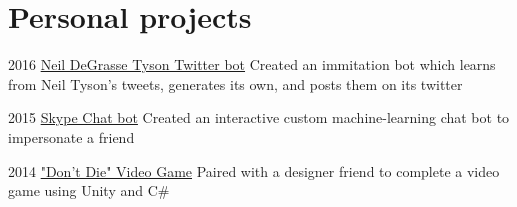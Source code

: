 \documentclass[oldfontcommands]{tccv}
\begin{document}
\section{Personal projects}

\begin{yearlist}

\item{2016}
     {\href{https://twitter.com/neiltyson_bot}{Neil DeGrasse Tyson Twitter bot}}
     {Created an immitation bot which learns from Neil Tyson's tweets, generates its own, and posts them on its twitter}

\item{2015}
     {\href{https://github.com/apophis981/skype_bot}{Skype Chat bot}}
     {Created an interactive custom machine-learning chat bot to impersonate a friend}

\item{2014}
     {\href{https://github.com/apophis981/game_dev/tree/master/select_an_object}{"Don't Die" Video Game}}
     {Paired with a designer friend to complete a video game using Unity and C\#}
\end{yearlist}
\end{document}
